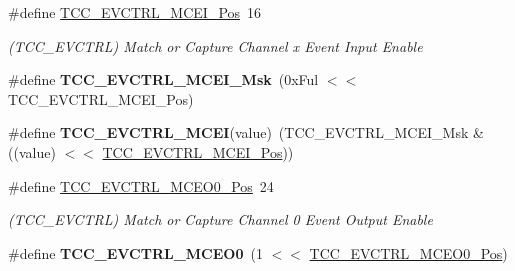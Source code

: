 \begin{DoxyCompactItemize}
\item 
\hypertarget{group___s_a_m_l21___t_c_c_gac04e8f1b91b2c84d40e481c2211f8f1a}{}\#define \hyperlink{group___s_a_m_l21___t_c_c_gac04e8f1b91b2c84d40e481c2211f8f1a}{T\+C\+C\+\_\+\+E\+V\+C\+T\+R\+L\+\_\+\+M\+C\+E\+I\+\_\+\+Pos}~16\label{group___s_a_m_l21___t_c_c_gac04e8f1b91b2c84d40e481c2211f8f1a}

\begin{DoxyCompactList}\small\item\em (T\+C\+C\+\_\+\+E\+V\+C\+T\+R\+L) Match or Capture Channel x Event Input Enable \end{DoxyCompactList}\item 
\hypertarget{group___s_a_m_l21___t_c_c_ga91a6fce7465f1ad1f293042bf65fe844}{}\#define {\bfseries T\+C\+C\+\_\+\+E\+V\+C\+T\+R\+L\+\_\+\+M\+C\+E\+I\+\_\+\+Msk}~(0x\+Ful $<$$<$ T\+C\+C\+\_\+\+E\+V\+C\+T\+R\+L\+\_\+\+M\+C\+E\+I\+\_\+\+Pos)\label{group___s_a_m_l21___t_c_c_ga91a6fce7465f1ad1f293042bf65fe844}

\item 
\hypertarget{group___s_a_m_l21___t_c_c_ga21eebea0761a71bdaebb2ca7fa2688e0}{}\#define {\bfseries T\+C\+C\+\_\+\+E\+V\+C\+T\+R\+L\+\_\+\+M\+C\+E\+I}(value)~(T\+C\+C\+\_\+\+E\+V\+C\+T\+R\+L\+\_\+\+M\+C\+E\+I\+\_\+\+Msk \& ((value) $<$$<$ \hyperlink{group___s_a_m_l21___t_c_c_gac04e8f1b91b2c84d40e481c2211f8f1a}{T\+C\+C\+\_\+\+E\+V\+C\+T\+R\+L\+\_\+\+M\+C\+E\+I\+\_\+\+Pos}))\label{group___s_a_m_l21___t_c_c_ga21eebea0761a71bdaebb2ca7fa2688e0}

\item 
\hypertarget{group___s_a_m_l21___t_c_c_ga9fc4863479d6632016b5d38f28b99edd}{}\#define \hyperlink{group___s_a_m_l21___t_c_c_ga9fc4863479d6632016b5d38f28b99edd}{T\+C\+C\+\_\+\+E\+V\+C\+T\+R\+L\+\_\+\+M\+C\+E\+O0\+\_\+\+Pos}~24\label{group___s_a_m_l21___t_c_c_ga9fc4863479d6632016b5d38f28b99edd}

\begin{DoxyCompactList}\small\item\em (T\+C\+C\+\_\+\+E\+V\+C\+T\+R\+L) Match or Capture Channel 0 Event Output Enable \end{DoxyCompactList}\item 
\hypertarget{group___s_a_m_l21___t_c_c_gaeaf554992399843d55b3d092423eea6f}{}\#define {\bfseries T\+C\+C\+\_\+\+E\+V\+C\+T\+R\+L\+\_\+\+M\+C\+E\+O0}~(1 $<$$<$ \hyperlink{group___s_a_m_l21___t_c_c_ga9fc4863479d6632016b5d38f28b99edd}{T\+C\+C\+\_\+\+E\+V\+C\+T\+R\+L\+\_\+\+M\+C\+E\+O0\+\_\+\+Pos})\label{group___s_a_m_l21___t_c_c_gaeaf554992399843d55b3d092423eea6f}


\end{DoxyCompactItemize}
